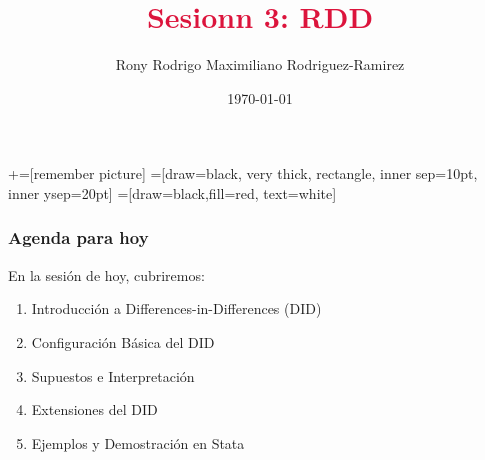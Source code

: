 \documentclass[notes,10pt,aspectratio=169]{beamer}
\title[]{\textcolor{crimson}{Sesionn 3: RDD}}
\author[RRMRR]{Rony Rodrigo Maximiliano Rodriguez-Ramirez}
\institute[Harvard]{\small{Econ Thaki \\ Harvard University}}
\date{\today}
\begin{document}
\newcommand\marktopleft[1]{%
    \tikz[overlay,remember picture] 
        \node (marker-#1-a) at (-.3em,.3em) {};%
}
\newcommand\markbottomright[2]{%
    \tikz[overlay,remember picture] 
        \node (marker-#1-b) at (0em,0em) {};%
}
+=[remember picture] 
 =[draw=black, very thick, rectangle, inner sep=10pt, inner ysep=20pt]
 =[draw=black,fill=red, text=white]



\begin{frame}
  \maketitle
\end{frame}

\begin{frame}
  \frametitle{Agenda para hoy}

  En la sesión de hoy, cubriremos:
  \begin{enumerate}
    \item Introducción a Differences-in-Differences (DID)
    \item Configuración Básica del DID
    \item Supuestos e Interpretación
    \item Extensiones del DID
    \item Ejemplos y Demostración en Stata
  \end{enumerate}
\end{frame}
\end{document}
